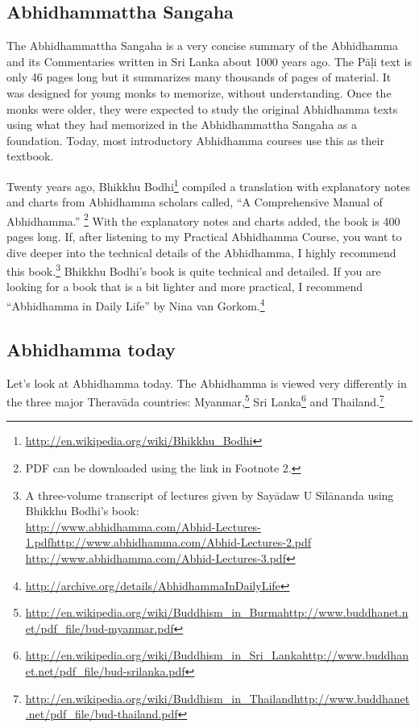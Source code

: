 \subsection*{Abhidhammattha Sangaha}

The Abhidhammattha Sangaha is a very concise summary of the Abhidhamma and its Commentaries written in Sri Lanka about 1000 years ago. The Pāḷi text is only 46 pages long but it summarizes many thousands of pages of material. It was designed for young monks to memorize, without understanding. Once the monks were older, they were expected to study the original Abhidhamma texts using what they had memorized in the Abhidhammattha Sangaha as a foundation. Today, most introductory Abhidhamma courses use this as their textbook.

Twenty years ago, Bhikkhu Bodhi\footnote{\url{http://en.wikipedia.org/wiki/Bhikkhu_Bodhi}} compiled a translation with explanatory notes and charts from Abhidhamma scholars called, “A Comprehensive Manual of Abhidhamma.” \footnote{PDF can be downloaded using the link in Footnote 2.} With the explanatory notes and charts added, the book is 400 pages long. If, after listening to my Practical Abhidhamma Course, you want to dive deeper into the technical details of the Abhidhamma, I highly recommend this book.\footnote{A three-volume transcript of lectures given by Sayādaw U Sīlānanda using Bhikkhu Bodhi’s book:\\ \url{http://www.abhidhamma.com/Abhid-Lectures-1.pdf}\linebreak \url{http://www.abhidhamma.com/Abhid-Lectures-2.pdf} \linebreak \url{http://www.abhidhamma.com/Abhid-Lectures-3.pdf}} Bhikkhu Bodhi’s book is quite technical and detailed. If you are looking for a book that is a bit lighter and more practical, I recommend “Abhidhamma in Daily Life” by Nina van Gorkom.\footnote{\url{http://archive.org/details/AbhidhammaInDailyLife}}

\subsection*{Abhidhamma today}

Let’s look at Abhidhamma today. The Abhidhamma is viewed very differently in the three major Theravāda countries: Myanmar,\footnote{\url{http://en.wikipedia.org/wiki/Buddhism_in_Burma}\linebreak\url{http://www.buddhanet.net/pdf_file/bud-myanmar.pdf}} Sri Lanka\footnote{\url{http://en.wikipedia.org/wiki/Buddhism_in_Sri_Lanka}\linebreak\url{http://www.buddhanet.net/pdf_file/bud-srilanka.pdf}} and Thailand.\footnote{\url{http://en.wikipedia.org/wiki/Buddhism_in_Thailand}\linebreak\url{http://www.buddhanet.net/pdf_file/bud-thailand.pdf}}

